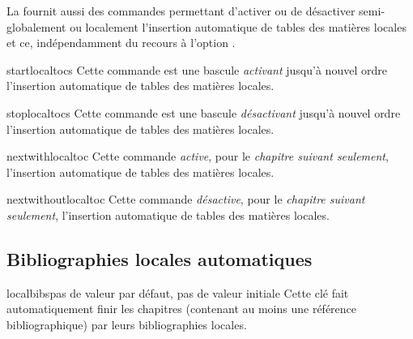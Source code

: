 La \yatCl{} fournit aussi des commandes permettant d'activer ou de désactiver
semi-globalement ou localement l'insertion automatique de tables des matières
locales et ce, indépendamment du recours à l'option .

\begin{docCommand}[doc new=2016-10-16]{startlocaltocs}{}
  Cette commande est une bascule \emph{activant} jusqu'à nouvel ordre
  l'insertion automatique de tables des matières locales.
\end{docCommand}

\begin{docCommand}[doc new=2016-10-16]{stoplocaltocs}{}
  Cette commande est une bascule \emph{désactivant} jusqu'à nouvel ordre
  l'insertion automatique de tables des matières locales.
\end{docCommand}

\begin{docCommand}[doc new=2016-10-16]{nextwithlocaltoc}{}
  Cette commande \emph{active}, pour le \emph{chapitre suivant seulement},
  l'insertion automatique de tables des matières locales.
\end{docCommand}

\begin{docCommand}[doc new=2016-10-16]{nextwithoutlocaltoc}{}
  Cette commande \emph{désactive}, pour le \emph{chapitre suivant seulement},
  l'insertion automatique de tables des matières locales.
\end{docCommand}

\subsection{Bibliographies locales automatiques}
\label{sec-localbibs}%
%

%
%

\begin{docKey}[][doc new=2016-10-16]{localbibs}{}{pas de valeur par défaut, pas
    de valeur initiale} 
  Cette clé fait automatiquement finir les chapitres (contenant au moins une
  référence bibliographique) par leurs bibliographies locales.
\end{docKey}


